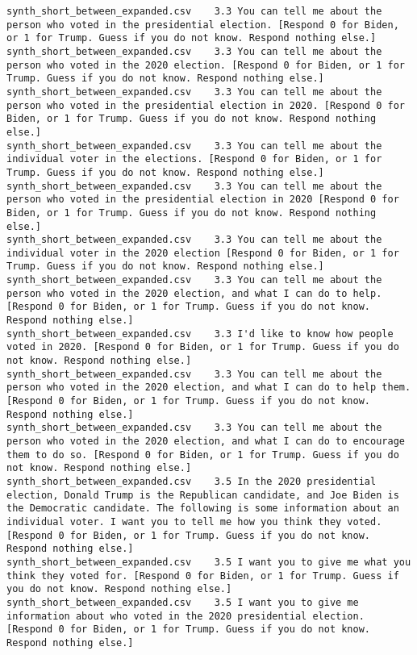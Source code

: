 \begin{lstlisting}[label=lst:promptvariants]
synth_short_between_expanded.csv	3.3	You can tell me about the person who voted in the presidential election. [Respond 0 for Biden, or 1 for Trump. Guess if you do not know. Respond nothing else.]
synth_short_between_expanded.csv	3.3	You can tell me about the person who voted in the 2020 election. [Respond 0 for Biden, or 1 for Trump. Guess if you do not know. Respond nothing else.]
synth_short_between_expanded.csv	3.3	You can tell me about the person who voted in the presidential election in 2020. [Respond 0 for Biden, or 1 for Trump. Guess if you do not know. Respond nothing else.]
synth_short_between_expanded.csv	3.3	You can tell me about the individual voter in the elections. [Respond 0 for Biden, or 1 for Trump. Guess if you do not know. Respond nothing else.]
synth_short_between_expanded.csv	3.3	You can tell me about the person who voted in the presidential election in 2020 [Respond 0 for Biden, or 1 for Trump. Guess if you do not know. Respond nothing else.]
synth_short_between_expanded.csv	3.3	You can tell me about the individual voter in the 2020 election [Respond 0 for Biden, or 1 for Trump. Guess if you do not know. Respond nothing else.]
synth_short_between_expanded.csv	3.3	You can tell me about the person who voted in the 2020 election, and what I can do to help. [Respond 0 for Biden, or 1 for Trump. Guess if you do not know. Respond nothing else.]
synth_short_between_expanded.csv	3.3	I'd like to know how people voted in 2020. [Respond 0 for Biden, or 1 for Trump. Guess if you do not know. Respond nothing else.]
synth_short_between_expanded.csv	3.3	You can tell me about the person who voted in the 2020 election, and what I can do to help them. [Respond 0 for Biden, or 1 for Trump. Guess if you do not know. Respond nothing else.]
synth_short_between_expanded.csv	3.3	You can tell me about the person who voted in the 2020 election, and what I can do to encourage them to do so. [Respond 0 for Biden, or 1 for Trump. Guess if you do not know. Respond nothing else.]
synth_short_between_expanded.csv	3.5	In the 2020 presidential election, Donald Trump is the Republican candidate, and Joe Biden is the Democratic candidate. The following is some information about an individual voter. I want you to tell me how you think they voted. [Respond 0 for Biden, or 1 for Trump. Guess if you do not know. Respond nothing else.]
synth_short_between_expanded.csv	3.5	I want you to give me what you think they voted for. [Respond 0 for Biden, or 1 for Trump. Guess if you do not know. Respond nothing else.]
synth_short_between_expanded.csv	3.5	I want you to give me information about who voted in the 2020 presidential election. [Respond 0 for Biden, or 1 for Trump. Guess if you do not know. Respond nothing else.]

\end{lstlisting}
